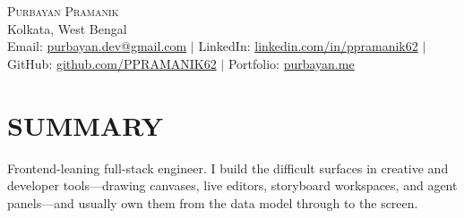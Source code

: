\documentclass[letterpaper, 10pt]{article}
\begin{document}

  \begin{center}
    {\Huge \scshape Purbayan Pramanik} \\
    \vspace{1pt}
    Kolkata, West Bengal \\
    \vspace{1pt}
    \footnotesize Email: \href{mailto:purbayan.dev@gmail.com}{purbayan.dev@gmail.com} $|$ LinkedIn: \href{https://linkedin.com/in/ppramanik62}{linkedin.com/in/ppramanik62} $|$ GitHub: \href{https://github.com/PPRAMANIK62}{github.com/PPRAMANIK62} $|$ Portfolio: \href{https://purbayan.me}{purbayan.me}
  \end{center}
  \vspace{-2pt}

  \section{SUMMARY}
  \vspace{-1pt}
  \small{Frontend-leaning full-stack engineer. I build the difficult surfaces in creative and developer tools---drawing canvases, live editors, storyboard workspaces, and agent panels---and usually own them from the data model through to the screen.}
  \vspace{-8pt}

\end{document}

